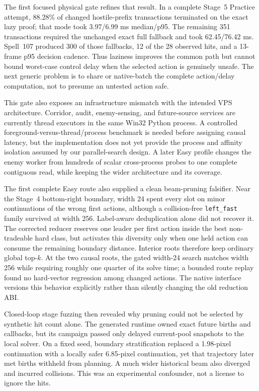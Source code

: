 \documentclass[10pt]{article}
\begin{document}
The first focused physical gate refines that result.  In a complete Stage~5
Practice attempt, 88.28\% of changed hostile-prefix transactions terminated on
the exact lazy proof; that mode took 3.97/6.99 ms median/p95.  The remaining
351 transactions required the unchanged exact full fallback and took
62.45/76.42 ms.  Spell~107 produced 300 of those fallbacks, 12 of the 28
observed hits, and a 13-frame p95 decision cadence.  Thus laziness improves the
common path but cannot bound worst-case control delay when the selected action
is genuinely unsafe.  The next generic problem is to share or native-batch the
complete action/delay computation, not to presume an untested action safe.

This gate also exposes an infrastructure mismatch with the intended VPS
architecture.  Corridor, audit, enemy-sensing, and future-source services are
currently thread executors in the same Win32 Python process.  A controlled
foreground-versus-thread/process benchmark is needed before assigning causal
latency, but the implementation does not yet provide the process and affinity
isolation assumed by our parallel-search design.  A later Easy profile changes
the enemy worker from hundreds of scalar cross-process probes to one complete
contiguous read, while keeping the wider architecture and its coverage.

The first complete Easy route also supplied a clean beam-pruning falsifier.
Near the Stage~4 bottom-right boundary, width 24 spent every slot on minor
continuations of the wrong first actions, although a collision-free
\texttt{left\_fast} family survived at width 256.  Label-aware deduplication
alone did not recover it.  The corrected reducer reserves one leader per first
action inside the best non-tradeable hard class, but activates this diversity
only when one held action can consume the remaining boundary distance.
Interior roots therefore keep ordinary global top-$k$.  At the two causal
roots, the gated width-24 search matches width 256 while requiring roughly one
quarter of its solve time; a bounded route replay found no hard-vector
regression among changed actions.  The native interface versions this behavior
explicitly rather than silently changing the old reduction ABI.

Closed-loop stage fuzzing then revealed why pruning could not be selected by
synthetic hit count alone.  The generated runtime owned exact future births and
callbacks, but its campaign passed only delayed current-pool snapshots to the
local solver.  On a fixed seed, boundary stratification replaced a 1.98-pixel
continuation with a locally safer 6.85-pixel continuation, yet that trajectory
later met births withheld from planning.  A much wider historical beam also
diverged and incurred collisions.  This was an experimental confounder, not a
license to ignore the hits.
\end{document}
